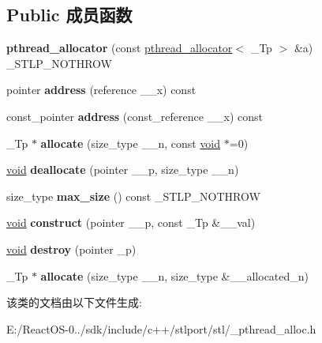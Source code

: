 \subsection*{Public 成员函数}
\begin{DoxyCompactItemize}
\item 
\mbox{\label{classpthread__allocator_ad51207a2fc6fc8c2cef129e7c9c7274f}} 
{\bfseries pthread\+\_\+allocator} (const \hyperlink{classpthread__allocator}{pthread\+\_\+allocator}$<$ \+\_\+\+Tp $>$ \&a) \+\_\+\+S\+T\+L\+P\+\_\+\+N\+O\+T\+H\+R\+OW
\item 
\mbox{\label{classpthread__allocator_ac68efd31b1195be9632e545a9e9a9c65}} 
pointer {\bfseries address} (reference \+\_\+\+\_\+x) const
\item 
\mbox{\label{classpthread__allocator_a92b05f0fdfd74aeba5a622b3c975da69}} 
const\+\_\+pointer {\bfseries address} (const\+\_\+reference \+\_\+\+\_\+x) const
\item 
\mbox{\label{classpthread__allocator_a1695725856840aaec9fc966e1ac1dfb6}} 
\+\_\+\+Tp $\ast$ {\bfseries allocate} (size\+\_\+type \+\_\+\+\_\+n, const \hyperlink{interfacevoid}{void} $\ast$=0)
\item 
\mbox{\label{classpthread__allocator_a42d84d16b7911840894f3c71b80156ce}} 
\hyperlink{interfacevoid}{void} {\bfseries deallocate} (pointer \+\_\+\+\_\+p, size\+\_\+type \+\_\+\+\_\+n)
\item 
\mbox{\label{classpthread__allocator_ae556985bbc4aa3a7b8e74f8588a5b55f}} 
size\+\_\+type {\bfseries max\+\_\+size} () const \+\_\+\+S\+T\+L\+P\+\_\+\+N\+O\+T\+H\+R\+OW
\item 
\mbox{\label{classpthread__allocator_a07162b29fe5d5516718c2f314f0bf20f}} 
\hyperlink{interfacevoid}{void} {\bfseries construct} (pointer \+\_\+\+\_\+p, const \+\_\+\+Tp \&\+\_\+\+\_\+val)
\item 
\mbox{\label{classpthread__allocator_ad9253392b3e544b00862e025910997fe}} 
\hyperlink{interfacevoid}{void} {\bfseries destroy} (pointer \+\_\+p)
\item 
\mbox{\label{classpthread__allocator_a785828dc77bfb60a2f4f172ddabacd69}} 
\+\_\+\+Tp $\ast$ {\bfseries allocate} (size\+\_\+type \+\_\+\+\_\+n, size\+\_\+type \&\+\_\+\+\_\+allocated\+\_\+n)
\end{DoxyCompactItemize}


该类的文档由以下文件生成\+:\begin{DoxyCompactItemize}
\item 
E\+:/\+React\+O\+S-\/0../sdk/include/c++/stlport/stl/\+\_\+pthread\+\_\+alloc.\+h\end{DoxyCompactItemize}

